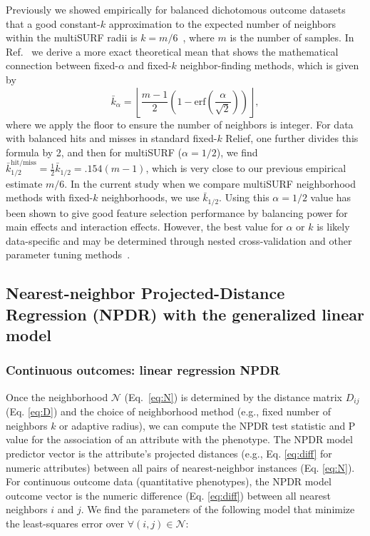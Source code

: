 \documentclass[10pt]{article}
\begin{document}
Previously we showed empirically for balanced dichotomous outcome datasets that a good constant-$k$ approximation to the expected number of neighbors within the multiSURF radii is $k=m/6$~\cite{stir}, where $m$ is the number of samples. In Ref.~\cite{bod} we derive a more exact theoretical mean that shows the mathematical connection between fixed-$\alpha$ and fixed-$k$ neighbor-finding methods, which is given by 
\begin{equation}\label{eq:kbar}
{\bar{k}}_{\alpha} = \left \lfloor \frac{m-1}{2}  \left( 1 - \mathrm{erf}\left( \frac{\alpha}{\sqrt{2}} \right) \right) \right \rfloor,
\end{equation}
where we apply the floor to ensure the number of neighbors is integer. For data with balanced hits and misses in standard fixed-$k$ Relief, one further divides this formula by 2, and then for multiSURF ($\alpha=1/2$), we find $\bar{k}_{1/2}^{\text{hit/miss}} = \frac{1}{2}\bar{k}_{1/2} = .154 (m-1)$, which is very close to our previous empirical estimate $m/6$. In the current study when we compare multiSURF neighborhood methods with fixed-$k$ neighborhoods, we use $\bar{k}_{1/2}$. Using this $\alpha=1/2$ value has been shown to give good feature selection performance by balancing power for main effects and interaction effects. However, the best value for $\alpha$ or $k$ is likely data-specific and may be determined through nested cross-validation and other parameter tuning methods~\cite{bod}. 

\subsection{Nearest-neighbor Projected-Distance Regression (NPDR) with the generalized linear model}

\subsubsection{Continuous outcomes: linear regression NPDR}\label{sec:regress}

Once the neighborhood $\mathcal{N}$ (Eq.~\ref{eq:N}) is determined by the distance matrix $D_{ij}$ (Eq. \ref{eq:D}) and the choice of neighborhood method (e.g., fixed number of neighbors $k$ or adaptive radius), we can compute the NPDR test statistic and P value for the association of an attribute with the phenotype. The NPDR model predictor vector is the attribute's projected distances (e.g., Eq. \ref{eq:diff} for numeric attributes) between all pairs of nearest-neighbor instances (Eq. \ref{eq:N}). For continuous outcome data (quantitative phenotypes), the NPDR model outcome vector is the numeric difference (Eq. \ref{eq:diff}) between all nearest neighbors $i$ and $j$. We find the parameters of the following model that minimize the least-squares error over $\forall(i,j) \in \mathcal{N}$: 
\end{document}
